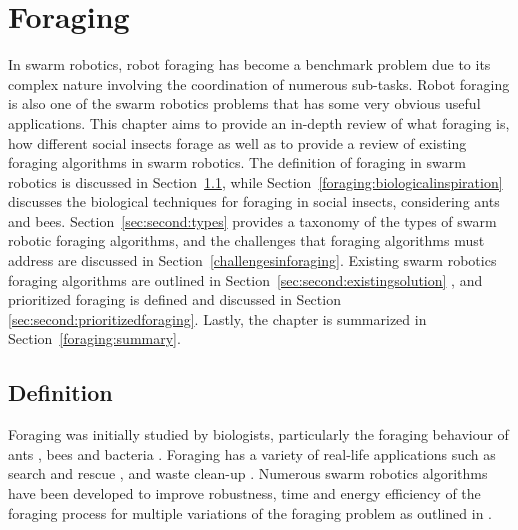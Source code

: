 
\chapter{Foraging}
\label{chap:second}


In swarm robotics, robot foraging has become a benchmark problem due to its complex nature involving the coordination of numerous sub-tasks. Robot foraging is also one of the swarm robotics problems that has some very obvious useful applications. This chapter aims to provide an in-depth review of what foraging is, how different social insects forage as well as to provide a review of existing foraging algorithms in swarm robotics. The definition of foraging in swarm robotics is discussed in Section~\ref{sec:second:definition}, while Section~\ref{foraging:biologicalinspiration} discusses the biological techniques for foraging in social insects, considering ants and bees. Section~\ref{sec:second:types} provides a taxonomy of the types of swarm robotic foraging algorithms, and the challenges that foraging algorithms must address are discussed in Section~\ref{challengesinforaging}. Existing swarm robotics foraging algorithms are outlined in Section~\ref{sec:second:existingsolution} , and prioritized foraging is defined and discussed in Section~
\ref{sec:second:prioritizedforaging}. Lastly, the chapter is summarized in Section~\ref{foraging:summary}. 



\section{Definition}
\label{sec:second:definition}

Foraging was initially studied by biologists, particularly the foraging behaviour of ants \cite{holldobler1990ants,bernstein1974seasonal}, bees \cite{seeley2009wisdom} and bacteria \cite{resnick1994turtles}. Foraging has a variety of real-life applications such as search and rescue \cite{jennings1997cooperative,murphy2000biomimetic}, and waste clean-up \cite{balch1995io}. Numerous swarm robotics algorithms have been developed to improve robustness, time and energy efficiency of the foraging process for multiple variations of the foraging problem as outlined in \cite{winfield2009foraging}. 

